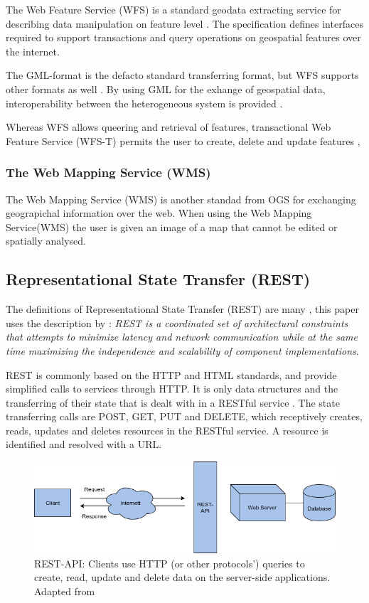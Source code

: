 The Web Feature Service (WFS) is a standard geodata extracting service for describing data manipulation on feature level \citep{Peng2005, Norgedigitalt2014}. The specification defines interfaces required to support transactions and query operations on geospatial features over the internet.

The GML-format is the defacto standard transferring format, but WFS supports other formats as well \citep{Eggan2017}. By using GML for the exhange of geospatial data,  interoperability between the heterogeneous system is provided \citep{YaoXiaobai2008Iimo}.

Whereas WFS allows queering and retrieval of features, transactional Web Feature Service (WFS-T) permits the user to create, delete and update features \citep{OGCNetwork},

\subsubsection{The Web Mapping Service (WMS)}
The Web Mapping Service (WMS) is another standad from OGS for exchanging geograpichal information over the web. When using the Web Mapping Service(WMS) the user is given an image of a map that cannot be edited or spatially analysed. 	


\subsection{Representational State Transfer (REST)}
The definitions of Representational State Transfer (REST) are many \citep{Fielding, Richardson}, this paper uses the description by \cite{Fieldinga}: \textit{REST is a coordinated set of architectural constraints that attempts to minimize latency and network communication while at the same time maximizing the independence and scalability of component implementations}. 

REST is commonly based on the HTTP and HTML standards, and provide simplified calls to services through HTTP. It is only data structures and the transferring of their state that is dealt with in a RESTful service \cite{Battle2008}. The state transferring calls are POST, GET, PUT and DELETE, which receptively creates, reads, updates and deletes resources in the RESTful service. A resource is identified and resolved with a URL.

\begin{figure}[H]
	\centering
	\includegraphics[scale=0.5]{img/REST}
	\caption{REST-API: Clients use  HTTP (or other protocols') queries to create, read, update and delete data on the server-side applications.  Adapted from \citep{Ceeb2013} }
	\label{fig:matr}
\end{figure}

